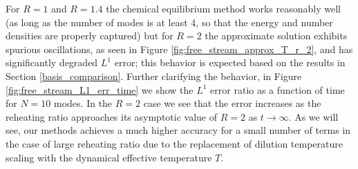 For $R=1$ and $R=1.4$  the chemical equilibrium method works reasonably well (as long as the number of modes is at least 4, so that the energy and number densities are properly captured) but for $R=2$ the approximate solution exhibits spurious oscillations, as seen in Figure \ref{fig:free_stream_approx_T_r_2}, and has significantly degraded $L^1$ error;  this behavior is expected based on the results in Section \ref{basis_comparison}. Further clarifying the behavior, in Figure \ref{fig:free_stream_L1_err_time}  we show the $L^1$ error ratio as a function of time for $N=10$ modes. In the $R=2$ case we see that the error increases as the reheating ratio approaches its asymptotic value of $R=2$ as $t\rightarrow\infty$.  As we will see, our methods achieves a much higher accuracy for a small number of terms in the case of large reheating ratio due to the replacement of dilution temperature scaling with the dynamical effective temperature $T$.  


